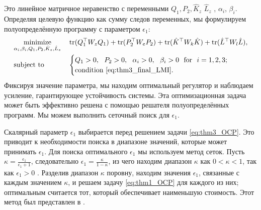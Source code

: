 Это линейное матричное неравенство с переменными ${Q}_1,{P}_2,\hat{{K}}_z$ $\hat{{L}}_z$ , $\alpha_i$, $\beta_i$. Определяя целевую функцию как сумму следов переменных, мы формулируем полуопределённую программу с параметром $\epsilon_1$:
%
\begin{equation}
	\label{eq:thm3_OCP}
	\begin{aligned}
		& \underset{\alpha_i, \beta_i, {Q}_1, {P}_2, \hat{{K}}_z, \hat{{L}}_z}{\text{minimize}}
		& & \operatorname{tr}({Q}_1^\top{W}_z{Q}_1)+ \operatorname{tr}({P}_2^\top{W}_e{P}_2)+ \operatorname{tr}(\hat{{K}}^\top{W}_k\hat{{K}})+\operatorname{tr}(\hat{{L}}^\top{W}_l\hat{{L}}), \\
		& \text{subject to}
		& & \begin{cases}
			{Q}_1 > 0, \ \
			{P}_2 > 0, \ \
			\alpha_i >0, \ \
			\beta_i>0 \ \
			\text{for} \ \ i=1,2,3;\\
			\text{condition \eqref{eq:thm3_final_LMI}}.
		\end{cases}
	\end{aligned}
\end{equation}
%
Фиксируя значение параметра, мы находим оптимальный регулятор и наблюдаем усиление, гарантирующее устойчивость системы. Эта оптимизационная задача может быть эффективно решена с помощью решателя полуопределённых программ. Мы можем выполнить сеточный поиск для $\epsilon_1$.
 \begin{remark}
	\label{rm:griding_search}
	Скалярный параметр $\epsilon_1$ выбирается перед решением задачи \eqref{eq:thm3_OCP}. Это приводит к необходимости поиска в диапазоне значений, которые может принимать $\epsilon_1$. Для поиска оптимального $\epsilon_1$ мы используем метод сеток. Пусть $\kappa=\frac{\epsilon_1}{\epsilon_1+1}$, следовательно
	$\epsilon_1=\frac{\kappa}{1-\kappa}$, из чего находим диапазон $\kappa$ как $0 < \kappa < 1$, так как $\epsilon_1 > 0$ \cite{Li1997}. Разделив диапазон $\kappa$ поровну, находим значения $\epsilon_1$, связанные с каждым значением $\kappa$, и решаем задачу \eqref{eq:thm1_OCP} для каждого из них; оптимальным считается тот, который обеспечивает наименьшую стоимость. Этот метод был представлен в \cite{Li1997}.
\end{remark}

